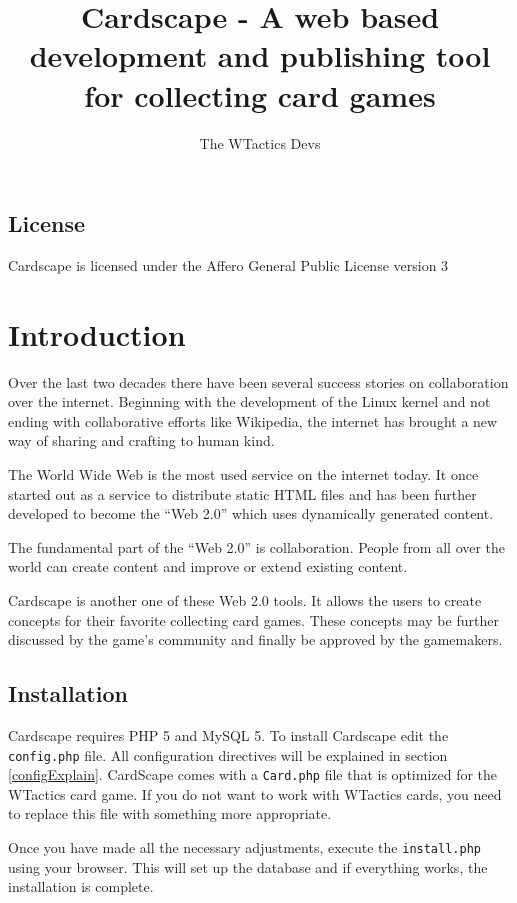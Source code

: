 \documentclass[a4paper, 11pt]{scrbook}
\title{Cardscape - A web based development and publishing tool for collecting card games}
\author{The WTactics Devs} %
\begin{document}
\maketitle
\tableofcontents

\section{License}
Cardscape is licensed under the Affero General Public License version 3%

\chapter{Introduction}
Over the last two decades there have been several success stories on collaboration over the internet. Beginning with the development of the Linux kernel and not ending with collaborative efforts like Wikipedia, the internet has brought a new way of sharing and crafting to human kind.

The World Wide Web is the most used service on the internet today. It once started out as a service to distribute static HTML files and has been further developed to become the ``Web 2.0'' which uses dynamically generated content.

The fundamental part of the ``Web 2.0'' is collaboration. People from all over the world can create content and improve or extend existing content.

Cardscape is another one of these Web 2.0 tools. It allows the users to create concepts for their favorite collecting card games. These concepts may be further discussed by the game's community and finally be approved by the gamemakers.

\section{Installation}
Cardscape requires PHP 5 and MySQL 5. To install Cardscape edit the \texttt{config.php} file. All configuration directives will be explained in section \ref{configExplain}. CardScape comes with a \texttt{Card.php} file that is optimized for the WTactics card game. If you do not want to work with WTactics cards, you need to replace this file with something more appropriate.

Once you have made all the necessary adjustments, execute the \texttt{install.php} using your browser. This will set up the database and if everything works, the installation is complete.
\end{document}
